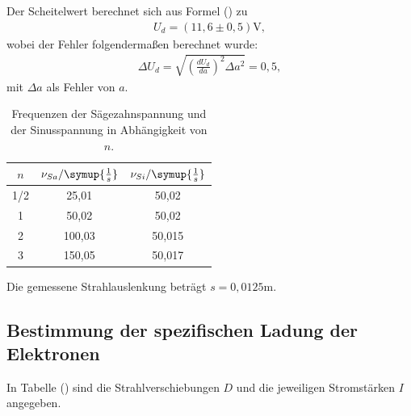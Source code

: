 \noindent Der Scheitelwert berechnet sich aus Formel () zu
\begin{align*}
U_d = (11,6 \pm 0,5) \si{\volt} ,
\end{align*}
wobei der Fehler folgendermaßen berechnet wurde:
\begin{align*}
\Delta U_d = \sqrt{(\frac{dU_d}{da})^2\Delta a^2} = 0,5 ,
\end{align*}
mit $\Delta a$ als Fehler von $a$.

\begin{table}[H]
  \centering
  \caption{Frequenzen der Sägezahnspannung und der Sinusspannung in Abhängigkeit von $n$.}
  \label{tab:Spannungsamplitude}
  \begin{tabular}{c c c}
    \toprule
    $n$ & $\nu_{Sa} / \symup{\frac{1}{s}}$ & $\nu_{Si} / \symup{\frac{1}{s}}$\\
    \midrule
    1/2 &  25,01 & 50,02 \\
      1 &  50,02 & 50,02 \\
      2 & 100,03 & 50,015 \\
      3 & 150,05 & 50,017\\
    \bottomrule
  \end{tabular}
\end{table}

\noindent Die gemessene Strahlauslenkung beträgt $s = 0,0125 \si{\m} $.

























\subsection{Bestimmung der spezifischen Ladung der Elektronen}
In Tabelle () sind die Strahlverschiebungen $D$ und die jeweiligen Stromstärken $I$ angegeben.


